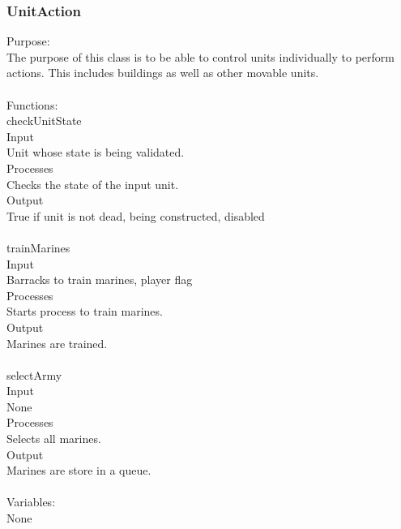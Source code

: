 \documentclass[10pt,letterpaper,onecolumn,draftclsnofoot]{IEEEtran}
\begin{document}
\subsubsection{UnitAction}
Purpose:\\
The purpose of this class is to be able to control units individually to perform actions. This includes buildings as well as other movable units.\\
\\
Functions:\\
checkUnitState\\
Input\\
Unit whose state is being validated.\\
Processes\\
Checks the state of the input unit.\\
Output\\
True if unit is not dead, being constructed, disabled\\
\\
trainMarines\\
Input\\
Barracks to train marines, player flag\\
Processes\\
Starts process to train marines.\\
Output\\
Marines are trained.\\
\\
selectArmy\\
Input\\
None\\
Processes\\
Selects all marines.\\
Output\\
Marines are store in a queue.\\
\\
Variables:\\
None\\
\end{document}
